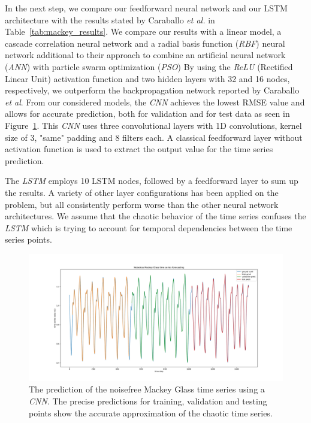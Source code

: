 \documentclass{article}
\begin{document}
In the next step, we compare our feedforward neural network and our LSTM
architecture with the results stated by Caraballo \textit{et al.}
\cite{caraballo2016} in Table~\ref{tab:mackey_results}. We 
compare our results with a linear model, a cascade correlation neural network
and a radial basis function (\emph{RBF})
neural network additional to their approach to
combine an artificial neural network (\emph{ANN}) with particle swarm
optimization (\emph{PSO}) By 
using the \emph{ReLU} (Rectified Linear Unit) activation function and two
hidden layers with 32 and 16 nodes, respectively, we outperform the 
backpropagation network reported by Caraballo \textit{et al}. 
From our considered models, the \emph{CNN} achieves the lowest RMSE value and
allows for accurate prediction, both for validation and for test data as seen
in Figure~\ref{fig:mackey_pred}. This \emph{CNN} uses three convolutional layers
with 1D convolutions, kernel size of 3, "same" padding and 8
filters each. A classical
feedforward layer without activation function is used to extract the output
value for the time series prediction.

The \emph{LSTM} employs 10 LSTM nodes, followed by a feedforward layer to sum up
the results. A variety of other layer configurations has been applied
on the problem,
but all consistently perform worse than the other neural network architectures.
We assume that the chaotic behavior of the time series confuses the \emph{LSTM}
which is trying to account for temporal dependencies between the time series
points.

\begin{figure}
  \centering
  \includegraphics[width=\linewidth]{figures/mg_pred_cnn.pdf}
  \caption{The prediction of the noisefree Mackey Glass time series using a
    \emph{CNN}. The precise predictions for training, validation and testing
    points show the accurate approximation of the chaotic time series.}
  \label{fig:mackey_pred}
\end{figure}
\end{document}
